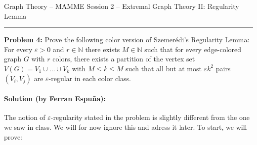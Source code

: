 \documentclass{amsart}
\theoremstyle{plain}
\theoremstyle{definition}
\newcommand{\N}{\mathbb{N}}
\begin{document}
    {\Large Graph Theory -- MAMME}
    {\Large Session 2 -- Extremal Graph Theory II: Regularity Lemma}

    \vspace{0.5cm}

    \hrule

    \vspace{0.5cm}

    \noindent \textbf{Problem 4:}
    Prove the following color version of Szemerédi's Regularity Lemma:
    For every $\varepsilon > 0$ and $r \in \N$ there exists $M \in \N$ such that
    for every edge-colored graph $G$ with $r$ colors, there exists a partition of the vertex set
    $V(G) = V_1 \cup \ldots \cup V_k$ with $M \leq k \leq M$ such that
    all but at most $\varepsilon k^2$ pairs $(V_i, V_j)$ are $\varepsilon$-regular in each color class.


    \paragraph{\textbf{Solution (by Ferran Espuña):}}

    The notion of $\varepsilon$-regularity stated in the problem is slightly different from the one we saw in class.
    We will for now ignore this and adress it later.
    To start, we will prove:
\end{document}

